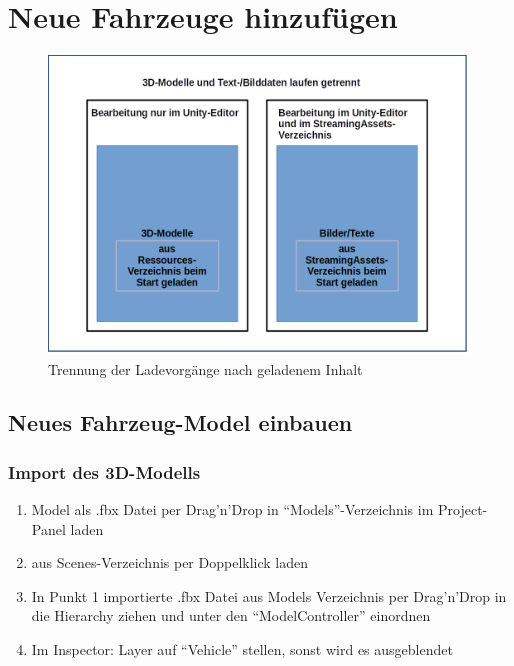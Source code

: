 \chapter{Neue Fahrzeuge hinzufügen}
\label{cha:newentries}
%
\begin{figure}[htp]
	\centering
	\includegraphics[width=0.8\linewidth]{img/new_entries}
	\caption[structure]{Trennung der Ladevorgänge nach geladenem Inhalt}
	\label{fig:newentry}
\end{figure}
%
\section{Neues Fahrzeug-Model einbauen}
%
\subsection{Import des 3D-Modells}
%
\begin{enumerate}
	\item Model als .fbx Datei per Drag'n'Drop in \enquote{Models}-Verzeichnis im Project-Panel laden
	\item \vhs{} aus Scenes-Verzeichnis per Doppelklick laden
	\item In Punkt 1 importierte .fbx Datei aus Models Verzeichnis per Drag'n'Drop in die Hierarchy ziehen und unter den \enquote{ModelController} einordnen
	\item Im Inspector: Layer auf \enquote{Vehicle} stellen, sonst wird es ausgeblendet
\end{enumerate}
%
\newpage
